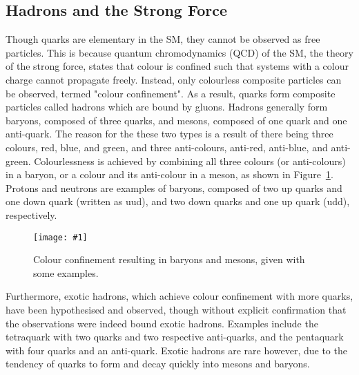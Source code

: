 \documentclass[twocolumn]{article}
\newcommand{\insertFigure}[1]{%
   \texttt{[image: \#1]}%
}
\begin{document}
\subsection{Hadrons and the Strong Force}
Though quarks are elementary in the SM, they cannot be observed as free particles. This is because quantum chromodynamics (QCD) of the SM, the theory of the strong force, states that colour is confined such that systems with a colour charge cannot propagate freely. Instead, only colourless composite particles can be observed, termed "colour confinement". As a result, quarks form composite particles called hadrons which are bound by gluons. Hadrons generally form baryons, composed of three quarks, and mesons, composed of one quark and one anti-quark. The reason for the these two types is a result of there being three colours, red, blue, and green, and three anti-colours, anti-red, anti-blue, and anti-green. Colourlessness is achieved by combining all three colours (or anti-colours) in a baryon, or a colour and its anti-colour in a meson, as shown in Figure~\ref{fig:colour}. Protons and neutrons are examples of baryons, composed of two up quarks and one down quark (written as uud), and two down quarks and one up quark (udd), respectively.
\begin{figure}[!h]
	\centering
	\insertFigure{colour.png}
	\caption{Colour confinement resulting in baryons and mesons, given with some examples.~\cite{colour}}
	\label{fig:colour}
\end{figure}
Furthermore, exotic hadrons, which achieve colour confinement with more quarks, have been hypothesised and observed, though without explicit confirmation that the observations were indeed bound exotic hadrons. Examples include the tetraquark with two quarks and two respective anti-quarks, and the pentaquark with four quarks and an anti-quark. Exotic hadrons are rare however, due to the tendency of quarks to form and decay quickly into mesons and baryons.
\end{document}
